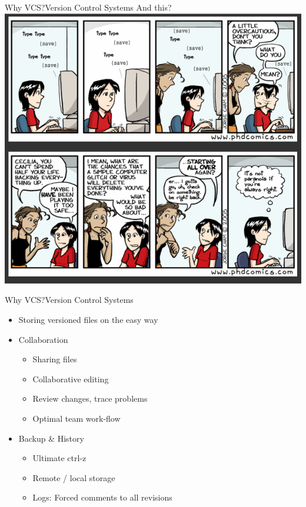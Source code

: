 \documentclass{beamer}
\begin{document}
\begin{frame}{Why VCS?}{Version Control Systems}
And this?\\
\centering
    \includegraphics[height=0.8\textheight]{ctrl-s.png}
\end{frame}

\begin{frame}{Why VCS?}{Version Control Systems}
\begin{itemize}
  \setlength\itemsep{0.2in}
\item Storing versioned files on the easy way
\item Collaboration
	\begin{itemize}
	\item Sharing files
	\item Collaborative editing
	\item Review changes, trace problems
	\item Optimal team work-flow
	\end{itemize}
\item Backup \& History
	\begin{itemize}
	\item Ultimate ctrl-z
	\item Remote / local storage
	\item Logs: Forced comments to all revisions
	\end{itemize}
\end{itemize}
\end{frame}
\end{document}
